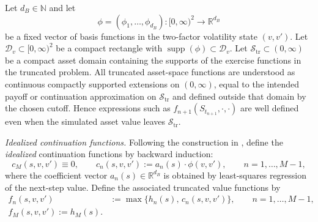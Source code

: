 \documentclass[10pt]{article}
\theoremstyle{plain}
\theoremstyle{definition}
\theoremstyle{remark}
\newcommand{\supp}{\operatorname{supp}}
\begin{document}
Let $d_B\in\mathbb{N}$ and let
\[
\phi = (\phi_1,\dots,\phi_{d_B}) : [0,\infty)^2 \to \mathbb{R}^{d_B}
\]
be a fixed vector of basis functions in the two-factor volatility state $(v,v')$.
Let $\mathcal{D}_v\subset [0,\infty)^2$ be a compact rectangle with $\supp(\phi)\subset \mathcal{D}_v$.
Let $\mathcal S_{\mathrm{tr}}\subset(0,\infty)$ be a compact asset domain containing the supports of the
exercise functions in the truncated problem. All truncated asset-space functions are understood as continuous
compactly supported extensions on $(0,\infty)$, equal to the intended payoff or continuation approximation on
$\mathcal S_{\mathrm{tr}}$ and defined outside that domain by the chosen cutoff. Hence expressions such as
$f_{n+1}(S_{t_{n+1}},\cdot,\cdot)$ are well defined even when the simulated asset value leaves
$\mathcal S_{\mathrm{tr}}$.

\noindent\emph{Idealized continuation functions.}
Following the construction in \cite{farahany2020mixing}, define the \emph{idealized} continuation functions by backward
induction:
\[
c_M(s,v,v') \equiv 0,\qquad
c_n(s,v,v') := a_n(s)\cdot \phi(v,v'),\qquad n=1,\dots,M-1,
\]
where the coefficient vector $a_n(s)\in\mathbb{R}^{d_B}$ is obtained by least-squares regression
of the next-step value.
Define the associated truncated value functions by
\[
\begin{aligned}
f_n(s,v,v')&:= \max\{h_n(s),\,c_n(s,v,v')\},
\qquad n=1,\dots,M-1,\\
f_M(s,v,v') := h_M(s).
\end{aligned}
\]
\end{document}
